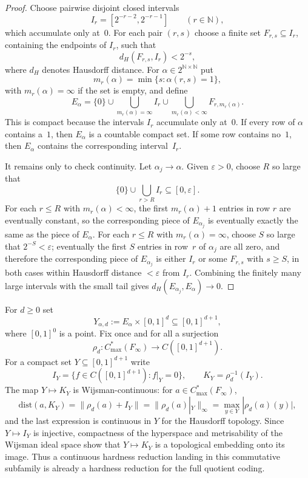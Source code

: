\documentclass[12pt,fleqn,a4paper]{amsart}
\renewcommand{\le}{\leqslant}
\renewcommand{\ge}{\geqslant}
\numberwithin{equation}{section}
\theoremstyle{definition}
\newcommand{\N}{\mathbb{N}}
\newcommand{\dist}{\mathrm{dist}}
\begin{document}
\begin{proof}
Choose pairwise disjoint closed intervals
\[
        I_r=[2^{-r-2},2^{-r-1}]\qquad(r\in\N),
\]
which accumulate only at~$0$.  For each pair $(r,s)$ choose a finite set
$F_{r,s}\subseteq I_r$, containing the endpoints of $I_r$, such that
\[
        d_H(F_{r,s},I_r)<2^{-s},
\]
where $d_H$ denotes Hausdorff distance.  For $\alpha\in2^{\N\times\N}$ put
\[
        m_r(\alpha)=\min\{s:\alpha(r,s)=1\},
\]
with $m_r(\alpha)=\infty$ if the set is empty, and define
\[
        E_\alpha=
        \{0\}
        \cup\bigcup_{m_r(\alpha)=\infty} I_r
        \cup\bigcup_{m_r(\alpha)<\infty} F_{r,m_r(\alpha)} .
\]
This is compact because the intervals $I_r$ accumulate only at~$0$.
If every row of $\alpha$ contains a~$1$, then $E_\alpha$ is a countable compact set.
If some row contains no~$1$, then $E_\alpha$ contains the corresponding interval~$I_r$.

It remains only to check continuity.  Let $\alpha_j\to\alpha$.  Given $\varepsilon>0$,
choose $R$ so large that
\[
        \{0\}\cup\bigcup_{r>R} I_r \subseteq [0,\varepsilon].
\]
For each $r\le R$ with $m_r(\alpha)<\infty$, the first $m_r(\alpha)+1$ entries in row
$r$ are eventually constant, so the corresponding piece of $E_{\alpha_j}$ is eventually
exactly the same as the piece of $E_\alpha$.  For each $r\le R$ with
$m_r(\alpha)=\infty$, choose $S$ so large that $2^{-S}<\varepsilon$; eventually the
first $S$ entries in row~$r$ of $\alpha_j$ are all zero, and therefore the corresponding
piece of $E_{\alpha_j}$ is either $I_r$ or some $F_{r,s}$ with $s\ge S$, in both cases
within Hausdorff distance $<\varepsilon$ from $I_r$.  Combining the finitely many
large intervals with the small tail gives $d_H(E_{\alpha_j},E_\alpha)\to0$.
\end{proof}

For $d\ge0$ set
\[
        Y_{\alpha,d}:=E_\alpha\times [0,1]^d\subseteq [0,1]^{d+1},
\]
where $[0,1]^0$ is a point.  Fix once and for all a surjection
\[
        \rho_d:C^*_{\max}(F_\infty)\longrightarrow C([0,1]^{d+1}).
\]
For a compact set $Y\subseteq [0,1]^{d+1}$ write
\[
        I_Y=\{f\in C([0,1]^{d+1}):f|_Y=0\},
        \qquad
        K_Y=\rho_d^{-1}(I_Y).
\]
The map $Y\mapsto K_Y$ is Wijsman-continuous: for $a\in C^*_{\max}(F_\infty)$,
\[
        \dist(a,K_Y)=\|\rho_d(a)+I_Y\|=\|\rho_d(a)|_Y\|_\infty
        =\max_{y\in Y}|\rho_d(a)(y)|,
\]
and the last expression is continuous in $Y$ for the Hausdorff topology.
Since $Y\mapsto I_Y$ is injective, compactness of the hyperspace and metrisability of the
Wijsman ideal space show that $Y\mapsto K_Y$ is a topological embedding onto its image.
Thus a continuous hardness reduction landing in this commutative subfamily is already a
hardness reduction for the full quotient coding.
\end{document}
